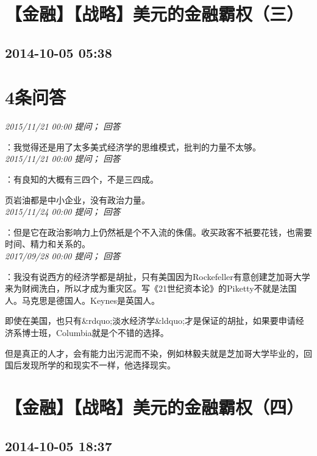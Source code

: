 \documentclass[twocolumn]{ctexart}
\begin{document}
\section{【金融】【战略】美元的金融霸权（三）}
\subsection{2014-10-05 05:38}


\section{4条问答}

\textit{\hfill\noindent\small 2015/11/21 00:00 提问； 回答}

：我觉得还是用了太多美式经济学的思维模式，批判的力量不太够。\\

\textit{\hfill\noindent\small 2015/11/21 00:00 提问； 回答}

：有良知的大概有三四个，不是三四成。

页岩油都是中小企业，没有政治力量。\\

\textit{\hfill\noindent\small 2015/11/24 00:00 提问； 回答}

：但是它在政治影响力上仍然衹是个不入流的侏儒。收买政客不衹要花钱，也需要时间、精力和关系的。\\

\textit{\hfill\noindent\small 2017/09/28 00:00 提问； 回答}

：我没有说西方的经济学都是胡扯，只有美国因为Rockefeller有意创建芝加哥大学来为财阀洗白，所以才成为重灾区。写《21世纪资本论》的Piketty不就是法国人。马克思是德国人。Keynes是英国人。

即使在美国，也只有\&rdquo;淡水经济学\&ldquo;才是保证的胡扯，如果要申请经济系博士班，Columbia就是个不错的选择。

但是真正的人才，会有能力出污泥而不染，例如林毅夫就是芝加哥大学毕业的，回国后发现所学的和现实不一样，他选择现实。\\


\section{【金融】【战略】美元的金融霸权（四）}
\subsection{2014-10-05 18:37}
\end{document}
